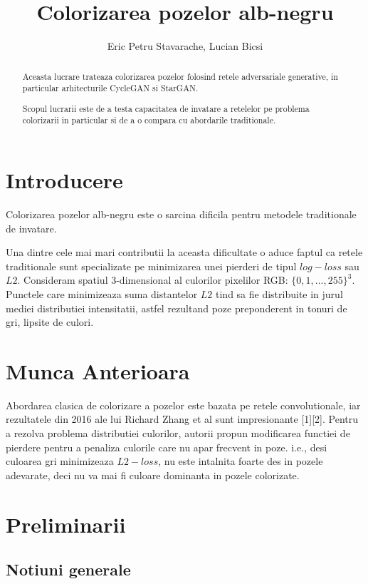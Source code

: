 \documentclass[12pt]{article}
\title{Colorizarea pozelor alb-negru}
\date{}
\author{Eric Petru Stavarache, Lucian Bicsi}
\theoremstyle{definition}
\begin{document}
\maketitle

\tableofcontents


\begin{abstract}
    Aceasta lucrare trateaza colorizarea pozelor folosind retele adversariale generative, in particular arhitecturile CycleGAN si StarGAN.

    Scopul lucrarii este de a testa capacitatea de invatare a retelelor pe problema colorizarii in particular si de a o compara cu abordarile traditionale.
\end{abstract}

\section{Introducere}

Colorizarea pozelor alb-negru este o sarcina dificila pentru metodele traditionale de invatare.

Una dintre cele mai mari contributii la aceasta dificultate o aduce faptul ca retele traditionale sunt specializate pe minimizarea unei pierderi de tipul $log-loss$ sau $L2$.
Consideram spatiul 3-dimensional al culorilor pixelilor RGB: $\{0, 1, ..., 255 \}^{3}$. Punctele care minimizeaza suma distantelor $L2$ tind sa fie distribuite in jurul mediei distributiei intensitatii, astfel rezultand poze preponderent in tonuri de gri, lipsite de culori.

\section{Munca Anterioara}

Abordarea clasica de colorizare a pozelor este bazata pe retele convolutionale, iar rezultatele din 2016 ale lui Richard Zhang et al sunt impresionante [1][2].
Pentru a rezolva problema distributiei culorilor, autorii propun modificarea functiei de pierdere pentru a penaliza culorile care nu apar frecvent in poze.
i.e., desi culoarea gri minimizeaza $L2-loss$, nu este intalnita foarte des in pozele adevarate, deci nu va mai fi culoare dominanta in pozele colorizate.


\section{Preliminarii}

\subsection{Notiuni generale}
\end{document}
